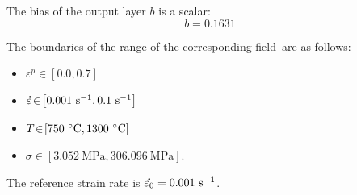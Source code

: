 \documentclass[algorithms,article,accept,pdftex,moreauthors]{Definitions/mdpi}
\DeclareRobustCommand{\mdot}[1]{\accentset{\mbox{\bfseries .}}{#1}}
\DeclareRobustCommand{\ps}{\text{s}^{-1}}
\DeclareRobustCommand{\MPa}{\text{MPa}}
\begin{document}
The bias of the output layer $b$ is a scalar:
\begin{equation*}
b = 0.1631
\end{equation*}

The boundaries of the range of the corresponding field~are as follows:
\begin{itemize}
\item $\varepsilon^p\!\in\!\left[0.0,0.7\right]$
\item $\mdot{\varepsilon}\!\in\!\left[0.001~\ps,0.1~\ps\right]$
\item $T\!\in\!\left[750~\celsius,1300~\celsius\right]$
\item $\sigma\!\in\!\left[3.052~\MPa,306.096~\MPa\right]$.
\end{itemize}

The reference strain rate is $\mdot{\varepsilon_0} = 0.001~\ps$.
\end{document}

